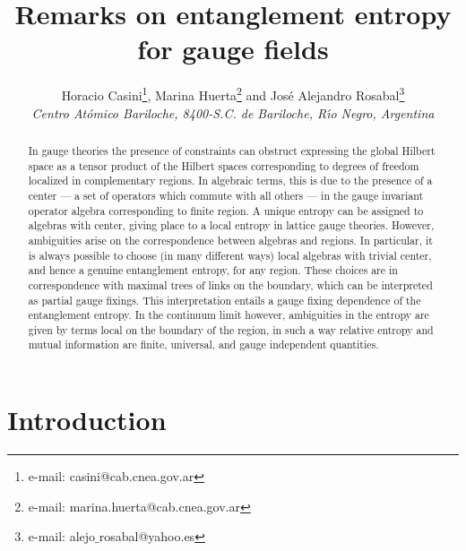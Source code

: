 \documentclass[12pt,a4paper]{article}
\begin{document}
\title{Remarks on entanglement entropy for gauge fields}
\author{Horacio Casini\footnote{e-mail: casini@cab.cnea.gov.ar}, Marina Huerta\footnote{e-mail: marina.huerta@cab.cnea.gov.ar} and Jos\'e Alejandro Rosabal\footnote{e-mail: alejo$\_$rosabal@yahoo.es}\\{\sl Centro At\'omico Bariloche,
8400-S.C. de Bariloche, R\'{\i}o Negro, Argentina}}
\date{}
\maketitle

\begin{abstract}
In gauge theories the presence of constraints can obstruct expressing the global Hilbert space as a tensor 
product of the Hilbert spaces corresponding to degrees of freedom localized in complementary regions. In 
algebraic terms, this is due to the presence of a center --- a set of operators which commute with all 
others --- in the gauge invariant operator algebra corresponding to finite region. A unique entropy can be assigned to 
algebras with center, giving place to a local entropy in lattice gauge theories. However, ambiguities 
arise on the correspondence between algebras and regions. In particular, it is always possible to choose 
(in many different ways) local algebras with trivial center, and hence a genuine entanglement entropy, 
for any region. These choices are in correspondence with maximal trees of links on the boundary, which 
can be interpreted as partial gauge fixings. This interpretation entails a gauge fixing dependence of 
the entanglement entropy. In the continuum limit however, ambiguities in the entropy are given by terms local 
on the boundary of the region, in such a way relative 
entropy and mutual information are finite, universal, and gauge independent quantities. 
\end{abstract}

\section{Introduction}
\end{document}
